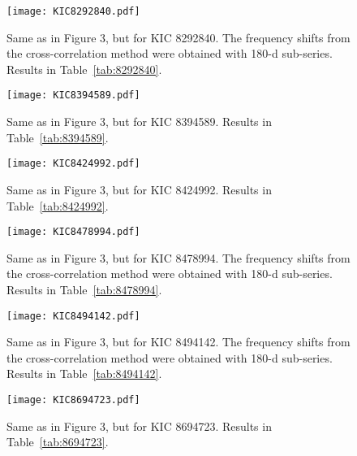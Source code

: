 \documentclass[twocolumn]{aastex61}%
\begin{document}
\begin{figure}[ht]
\texttt{[image: KIC8292840.pdf]}\vspace{-0.2cm}
\caption{Same as in Figure 3, but for KIC 8292840. The frequency shifts from the cross-correlation method were obtained with 180-d sub-series. Results in Table~\ref{tab:8292840}.}\label{fig:8292840}\vspace{-0.3cm}
\end{figure}

\begin{figure}[ht]
\texttt{[image: KIC8394589.pdf]}\vspace{-0.2cm}
\caption{Same as in Figure 3, but for KIC 8394589. Results in Table~\ref{tab:8394589}.}\label{fig:8394589}\vspace{-1cm}
\end{figure}

\begin{figure}[ht]
\texttt{[image: KIC8424992.pdf]}\vspace{-0.2cm}
\caption{Same as in Figure 3, but for KIC 8424992. Results in Table~\ref{tab:8424992}.}\label{fig:8424992}\vspace{-0.3cm}
\end{figure}

\begin{figure}[ht]\vspace{-0.2cm}
\texttt{[image: KIC8478994.pdf]}\vspace{-0.2cm}
\caption{Same as in Figure 3, but for KIC 8478994. The frequency shifts from the cross-correlation method were obtained with 180-d sub-series. Results in Table~\ref{tab:8478994}.}\label{fig:8478994}\vspace{-1cm}
\end{figure}

\begin{figure}[ht]
\texttt{[image: KIC8494142.pdf]}
\caption{Same as in Figure 3, but for KIC 8494142. The frequency shifts from the cross-correlation method were obtained with 180-d sub-series. Results in Table~\ref{tab:8494142}.}\label{fig:8494142}
\end{figure}

\begin{figure}[ht]
\texttt{[image: KIC8694723.pdf]}
\caption{Same as in Figure 3, but for KIC 8694723. Results in Table~\ref{tab:8694723}.}\label{fig:8694723}
\end{figure}
\end{document}
